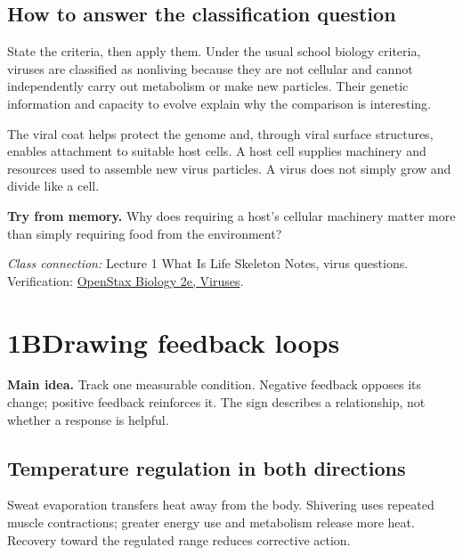 \documentclass[11pt,letterpaper]{article}
\newcommand{\pagechapter}[2]{\clearpage\section*{#1}\phantomsection\label{#2}\addcontentsline{toc}{section}{#1}}
\newcommand{\idea}[1]{\textbf{Main idea.} #1\par}
\newcommand{\memorycheck}[1]{\par\smallskip\textbf{Try from memory.} #1\par}
\newcommand{\classsource}[1]{{\footnotesize\textit{Class connection:} #1\par}}
\begin{document}
\subsection*{How to answer the classification question}
State the criteria, then apply them. Under the usual school biology criteria, viruses are classified as nonliving because they are not cellular and cannot independently carry out metabolism or make new particles. Their genetic information and capacity to evolve explain why the comparison is interesting.

The viral coat helps protect the genome and, through viral surface structures, enables attachment to suitable host cells. A host cell supplies machinery and resources used to assemble new virus particles. A virus does not simply grow and divide like a cell.
\memorycheck{Why does requiring a host's cellular machinery matter more than simply requiring food from the environment?}
\classsource{Lecture 1 What Is Life Skeleton Notes, virus questions. Verification: \href{https://openstax.org/books/biology-2e/pages/21-introduction}{OpenStax Biology 2e, Viruses}.}

\pagechapter{1B\quad Drawing feedback loops}{feedback}
\idea{Track one measurable condition. Negative feedback opposes its change; positive feedback reinforces it. The sign describes a relationship, not whether a response is helpful.}
\subsection*{Temperature regulation in both directions}
\begin{center}
\par
\end{center}
Sweat evaporation transfers heat away from the body. Shivering uses repeated muscle contractions; greater energy use and metabolism release more heat. Recovery toward the regulated range reduces corrective action.
\end{document}
